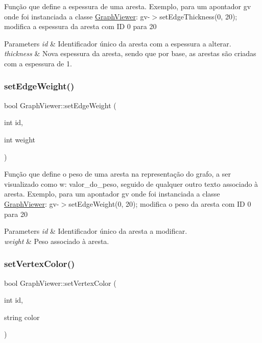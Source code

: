 Função que define a espessura de uma aresta. Exemplo, para um apontador gv onde foi instanciada a classe \hyperlink{class_graph_viewer}{Graph\+Viewer}\+: gv-\/$>$set\+Edge\+Thickness(0, 20); modifica a espessura da aresta com ID 0 para 20


\begin{DoxyParams}{Parameters}
{\em id} & Identificador único da aresta com a espessura a alterar. \\
\hline
{\em thickness} & Nova espessura da aresta, sendo que por base, as arestas são criadas com a espessura de 1. \\
\hline
\end{DoxyParams}
\mbox{\label{class_graph_viewer_ac211de009a0afe2e6d44f4f8d030a2cc}} 
\subsubsection{\texorpdfstring{set\+Edge\+Weight()}{setEdgeWeight()}}
{\footnotesize\ttfamily bool Graph\+Viewer\+::set\+Edge\+Weight (\begin{DoxyParamCaption}\item[{int}]{id,  }\item[{int}]{weight }\end{DoxyParamCaption})}

Função que define o peso de uma aresta na representação do grafo, a ser visualizado como w\+: valor\+\_\+do\+\_\+peso, seguido de qualquer outro texto associado à aresta. Exemplo, para um apontador gv onde foi instanciada a classe \hyperlink{class_graph_viewer}{Graph\+Viewer}\+: gv-\/$>$set\+Edge\+Weight(0, 20); modifica o peso da aresta com ID 0 para 20


\begin{DoxyParams}{Parameters}
{\em id} & Identificador único da aresta a modificar. \\
\hline
{\em weight} & Peso associado à aresta. \\
\hline
\end{DoxyParams}
\mbox{\label{class_graph_viewer_a8b542d7e09e81a45a74760c19233beb0}} 
\subsubsection{\texorpdfstring{set\+Vertex\+Color()}{setVertexColor()}}
{\footnotesize\ttfamily bool Graph\+Viewer\+::set\+Vertex\+Color (\begin{DoxyParamCaption}\item[{int}]{id,  }\item[{string}]{color }\end{DoxyParamCaption})}

